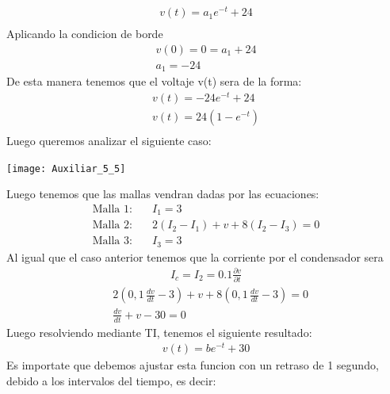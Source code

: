 \documentclass[
  11pt,
  letterpaper,
   addpoints,
   answers
  ]{exam}
\begin{document}
\begin{questions}
\begin{solution}
\begin{enumerate}
\begin{align}
                v(t) = a_{1}e^{-t} + 24\\
            \end{align}
            Aplicando la condicion de borde 
            \begin{align}
                v(0) = 0 = a_{1} + 24\\
                a_{1} = -24
            \end{align}
            De esta manera tenemos que el voltaje v(t) sera de la forma:
            \begin{align}
                v(t) = -24e^{-t} + 24\\
                v(t) = 24(1-e^{-t})\\
            \end{align}
            Luego queremos analizar el siguiente caso:
            \begin{center}
                \texttt{[image: Auxiliar\_5\_5]}
            \end{center}
            Luego tenemos que las mallas vendran dadas por las ecuaciones:
            \begin{align}
                \text{Malla 1:} \quad & I_1 =3\\
                \text{Malla 2:} \quad & 2(I_{2} - I_{1}) + v + 8(I_{2}- I_{3}) = 0 
                \\ 
                \text{Malla 3:} \quad & I_3 = 3\
            \end{align}
            Al igual que el caso anterior tenemos que la corriente por el condensador sera 
            \begin{align}
                I_{c} = I_{2} = 0.1\frac{\partial v}{\partial t}
            \end{align}
            \begin{align}
                &2\left(0{,}1\,\frac{d v}{d t} - 3\right) + v + 8\left(0{,}1\,\frac{d v}{d t} - 3\right) = 0 \\
                &\frac{d v}{d t} + v - 30 = 0 
            \end{align}
            Luego resolviendo mediante TI, tenemos el siguiente resultado:
            \begin{align}
                v(t) = b e^{-t} + 30
            \end{align}
            Es importate que debemos ajustar esta funcion con un retraso de 1 segundo, debido a los intervalos del tiempo, es decir:
            \begin{align}

\end{align}
\end{enumerate}
\end{solution}
\end{questions}
\end{document}
